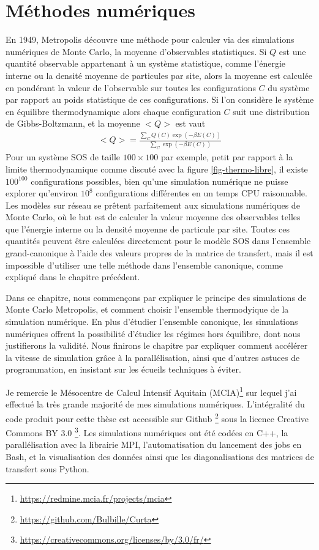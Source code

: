 \chapter{Méthodes numériques}
\label{chap-sim}

En 1949, Metropolis \cite{metropolis_monte_1949} découvre une méthode pour calculer via des simulations numériques de Monte Carlo, la moyenne d'observables statistiques. Si $Q$ est une quantité observable appartenant à un système statistique, comme l'énergie interne ou la densité moyenne de particules par site, alors la moyenne est calculée en pondérant la valeur de l'observable sur toutes les configurations $C$ du système par rapport au poids statistique de ces configurations. Si l'on considère le système en équilibre thermodynamique alors chaque configuration $C$ suit une distribution de Gibbs-Boltzmann, et la moyenne $<Q>$ est vaut
\begin{align}
    <Q> = \frac{\sum_{C} Q(C) \exp(-\beta E(C))}{\sum_{C} \exp(-\beta E(C))}
\end{align}
Pour un système SOS de taille $100\times100$ par exemple, petit par rapport à la limite thermodynamique comme discuté avec la figure \ref{fig-thermo-libre}, il existe $100^{100}$ configurations possibles, bien qu'une simulation numérique ne puisse explorer qu'environ $10^8$ configurations différentes en un temps CPU raisonnable.
Les modèles sur réseau se prêtent parfaitement aux simulations numériques de Monte Carlo, où le but est de calculer la valeur moyenne des observables telles que l'énergie interne ou la densité moyenne de particule par site. Toutes ces quantités peuvent être calculées directement pour le modèle SOS dans l'ensemble grand-canonique à l'aide des valeurs propres de la matrice de transfert, mais il est impossible d'utiliser une telle méthode dans l'ensemble canonique, comme expliqué dans le chapitre précédent.

Dans ce chapitre, nous commençons par expliquer le principe des simulations de Monte Carlo Metropolis, et comment choisir l'ensemble thermodyique de la simulation numérique. En plus d'étudier l'ensemble canonique, les simulations numériques offrent la possibilité d'étudier les régimes hors équilibre, dont nous justifierons la validité.
Nous finirons le chapitre par expliquer comment accélérer la vitesse de simulation grâce à la parallélisation, ainsi que d'autres astuces de programmation, en insistant sur les écueils techniques à éviter. 

Je remercie le Mésocentre de Calcul Intensif Aquitain (MCIA)\footnote{\url{https://redmine.mcia.fr/projects/mcia}} sur lequel j'ai effectué la très grande majorité de mes simulations numériques. 
L'intégralité du code produit pour cette thèse est accessible sur Github \footnote{\url{https://github.com/Bulbille/Curta}} sous la licence Creative Commons BY 3.0 \footnote{\url{https://creativecommons.org/licenses/by/3.0/fr/}}. Les simulations numériques ont été codées en C++, la parallélisation avec la librairie MPI, l'automatisation du lancement des jobs en Bash, et la visualisation des données ainsi que les diagonalisations des matrices de transfert sous Python.

